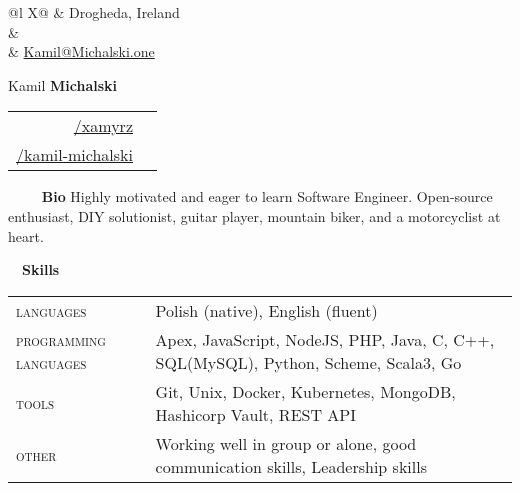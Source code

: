 \documentclass[a4paper, 11pt]{article}
\newcommand{\sectitle}[2]{\large{#1} \ \ \Large{\textbf{#2}}}
\begin{document}
	\pagestyle{fancy}

	\begin{center}
	\begin{multicols}{3}
		\begin{tabularx}{\linewidth}{@{}l X@{}}
			\faMapMarker & Drogheda, Ireland \\
			\IfFileExists{confidential.tex}{\faPhone & \href{tel:\phoneNumber}{\prettyPhoneNumber} \\}{}
			\faEnvelope	 & \href{mailto:Kamil@Michalski.one}{Kamil@Michalski.one} \\
		\end{tabularx} \vfill \null

		\columnbreak
			{ \Huge{Kamil \textbf{Michalski}}}
		\columnbreak

		\begin{tabularx}{\linewidth}{R | r}
				\href{https://github.com/xamyrz}{/xamyrz} & \faGithub \\
				\href{https://www.linkedin.com/in/kamil-michalski-7069451ab/}{/kamil-michalski} & \faLinkedin \\
		\end{tabularx} \vfill \null
	\end{multicols}
	\end{center}

	\vspace{-3.5mm}
	\begin{section}{\sectitle{\ \faUser}{\ Bio}}
		Highly motivated and eager to learn Software Engineer. Open-source enthusiast,  DIY solutionist, guitar player, mountain biker, and a motorcyclist at heart.  \\
	\end{section}
	\vspace{-3.5mm}

	\newcommand{\education}[6]{
		\textsc{#1} & #3: \textbf{#4} & \small{#5} \\[-0.5ex]
		\textsc{#2} & \multicolumn{2}{l}{\footnotesize #6}\\
	}

		\begin{section}{\sectitle{\faCogs}{Skills}}
		\begin{tabularx}{\linewidth}{@{}l  X}
			\textsc{languages} & Polish (native), English (fluent)\\
			\textsc{programming languages} & Apex, JavaScript, NodeJS, PHP, Java, C, C++, SQL(MySQL), Python, Scheme, Scala3, Go \\
			\textsc{tools} & Git, Unix, Docker, Kubernetes, MongoDB, Hashicorp Vault, REST API \\
			\textsc{other} & Working well in group or alone, good communication skills, Leadership skills
		\end{tabularx}
		\\ \\
	\end{section}
	\vspace{-3.5mm}
\end{document}
